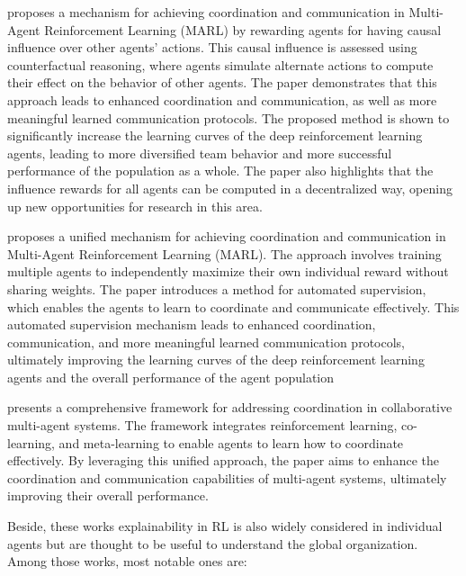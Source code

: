 \documentclass[runningheads]{llncs}
\begin{document}
\cite{Jaques2019} proposes a mechanism for achieving coordination and communication in Multi-Agent Reinforcement Learning (MARL) by rewarding agents for having causal influence over other agents' actions. This causal influence is assessed using counterfactual reasoning, where agents simulate alternate actions to compute their effect on the behavior of other agents. The paper demonstrates that this approach leads to enhanced coordination and communication, as well as more meaningful learned communication protocols. The proposed method is shown to significantly increase the learning curves of the deep reinforcement learning agents, leading to more diversified team behavior and more successful performance of the population as a whole. The paper also highlights that the influence rewards for all agents can be computed in a decentralized way, opening up new opportunities for research in this area.

\cite{Chongjie2008} proposes a unified mechanism for achieving coordination and communication in Multi-Agent Reinforcement Learning (MARL). The approach involves training multiple agents to independently maximize their own individual reward without sharing weights. The paper introduces a method for automated supervision, which enables the agents to learn to coordinate and communicate effectively. This automated supervision mechanism leads to enhanced coordination, communication, and more meaningful learned communication protocols, ultimately improving the learning curves of the deep reinforcement learning agents and the overall performance of the agent population

\cite{Tosic2010} presents a comprehensive framework for addressing coordination in collaborative multi-agent systems. The framework integrates reinforcement learning, co-learning, and meta-learning to enable agents to learn how to coordinate effectively. By leveraging this unified approach, the paper aims to enhance the coordination and communication capabilities of multi-agent systems, ultimately improving their overall performance. 

Beside, these works explainability in RL is also widely considered in individual agents but are thought to be useful to understand the global organization. Among those works, most notable ones are:
\end{document}
